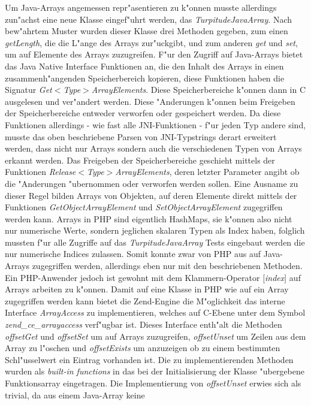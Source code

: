 Um Java-Arrays angemessen repr"asentieren zu k"onnen musste 
allerdings zun"achst eine neue Klasse eingef"uhrt werden, das \emph{TurpitudeJavaArray}. Nach bew"ahrtem Muster wurden dieser Klasse drei Methoden
gegeben, zum einen \emph{getLength}, die die L"ange des Arrays zur"uckgibt, und zum anderen \emph{get} und \emph{set}, um auf Elemente des Arrays zuzugreifen.
F"ur den Zugriff auf Java-Arrays bietet das Java Native Interface Funktionen an, die den Inhalt des Arrays in einen zusammenh"angenden Speicherbereich kopieren,
diese Funktionen haben die Signatur \emph{Get$<$Type$>$ArrayElements}. Diese Speicherbereiche k"onnen  dann in C ausgelesen und ver"andert werden. 
Diese "Anderungen k"onnen beim Freigeben der Speicherbereiche entweder verworfen oder gespeichert werden. Da diese
Funktionen allerdings - wie fast alle JNI-Funktionen - f"ur jeden Typ andere sind, musste das oben beschriebene Parsen von JNI-Typstrings derart erweitert werden,
dass nicht nur Arrays sondern auch die verschiedenen Typen von Arrays erkannt werden. Das Freigeben der Speicherbereiche geschieht mittels der
Funktionen \emph{Release$<$Type$>$ArrayElements}, deren letzter Parameter angibt ob die "Anderungen "ubernommen oder verworfen werden sollen.
Eine Ausname zu dieser Regel bilden Arrays von Objekten, auf deren Elemente direkt mittels der Funktionen \emph{GetObjectArrayElement} und
\emph{SetObjectArrayElement} zugegriffen werden kann.
Arrays in PHP sind eigentlich HashMaps, sie k"onnen also nicht nur numerische Werte, sondern jeglichen skalaren Typen als Index haben, folglich mussten
f"ur alle Zugriffe auf das \emph{TurpitudeJavaArray} Tests eingebaut werden die nur numerische Indices zulassen.
Somit konnte zwar von PHP aus auf Java-Arrays zugegriffen werden,
allerdings eben nur mit den beschriebenen Methoden. Ein PHP-Anwender jedoch ist gewohnt mit dem Klammern-Operator [\emph{index}] auf Arrays arbeiten zu k"onnen.
Damit auf eine Klasse in PHP wie auf ein Array zugegriffen werden kann bietet die Zend-Engine die M"oglichkeit das interne Interface \emph{ArrayAccess} zu
implementieren, welches auf C-Ebene unter dem Symbol \emph{zend\_ce\_arrayaccess} verf"ugbar ist. Dieses Interface enth"alt die Methoden \emph{offsetGet} und
\emph{offsetSet} um auf Arrays zuzugreifen, \emph{offsetUnset} um Zeilen aus dem Array zu l"oschen und \emph{offsetExists} um anzuzeigen ob zu einem
bestimmten Schl"usselwert ein Eintrag vorhanden ist. Die zu implementierenden Methoden wurden als \emph{built-in functions} in das bei der Initialisierung der
Klasse "ubergebene Funktionsarray eingetragen. Die Implementierung von \emph{offsetUnset} erwies sich als trivial, da aus einem Java-Array keine
